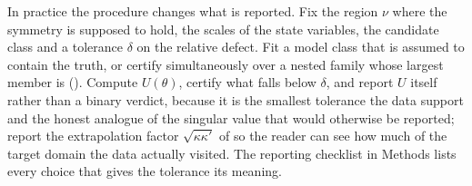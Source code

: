 \label{sec:related}
In practice the procedure changes what is reported. Fix the region $\nu$ where
the symmetry is supposed to hold, the scales of the state variables, the
candidate class and a tolerance $\delta$ on the relative defect. Fit a model
class that is assumed to contain the truth, or certify simultaneously over a
nested family whose largest member is (). Compute
$U(\theta)$, certify what falls below $\delta$, and report $U$ itself rather
than a binary verdict, because it is the smallest tolerance the data support
and the honest analogue of the singular value that would otherwise be
reported; report the extrapolation factor $\sqrt{\kappa\kappa'}$ of
 so the reader can see how much of the target domain
the data actually visited. The reporting checklist in Methods lists every
choice that gives the tolerance its meaning.

